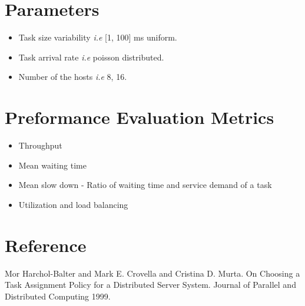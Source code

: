 \documentclass[11pt]{article}
\begin{document}
\section*{Parameters}
\begin{itemize}
	\item Task size variability \textit{i.e} [1, 100] ms uniform.
	\item Task arrival rate \textit{i.e} poisson distributed. 
	\item Number of the hosts \textit{i.e} 8, 16.
\end{itemize}

\section*{Preformance Evaluation Metrics}
\begin{itemize}
	\item Throughput
	\item Mean waiting time
	\item Mean slow down - Ratio of waiting time and service demand of a task
	\item Utilization and load balancing
\end{itemize}

\section*{Reference}
Mor Harchol-Balter and Mark E. Crovella and Cristina D. Murta.
On Choosing a Task Assignment Policy for a Distributed Server System.
Journal of Parallel and Distributed Computing 1999.
\end{document}
